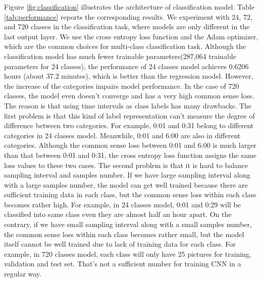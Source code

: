 \documentclass{article}
\begin{document}
Figure \ref{fig:classification} illustrates the architecture of classification model. Table \ref{tab:performance} reports the corresponding results. We experiment with 24, 72, and 720 classes in the classification task, where models are only different in the last output layer. We use the cross entropy loss function and the Adam optimizer, which are the common choices for multi-class classification task. Although the classification model has much fewer trainable parameters(287,064 trainable parameters for 24 classes), the performance of 24 classes model achieves 0.6206 hours (about 37.2 minutes), which is better than the regression model. However, the increase of the categories impairs model performance. In the case of 720 classes, the model even doesn't converge and has a very high common sense loss. The reason is that using time intervals as class labels has many drawbacks. The first problem is that this kind of label representation can't measure the degree of difference between two categories. For example, 0:01 and 0:31 belong to different categories in 24 classes model. Meanwhile, 0:01 and 6:00 are also in different categories. Although the common sense loss between 0:01 and 6:00 is much larger than that between 0:01 and 0:31, the cross entropy loss function assigns the same loss values to these two cases. The second problem is that it is hard to balance sampling interval and samples number. If we have large sampling interval along with a large samples number, the model can get well trained because there are sufficient training data in each class, but the common sense loss within each class becomes rather high. For example, in 24 classes model, 0:01 and 0:29 will be classified into same class even they are almost half an hour apart. On the contrary, if we have small sampling interval along with a small samples number, the common sense loss within each class becomes rather small, but the model itself cannot be well trained due to lack of training data for each class. For example, in 720 classes model, each class will only have 25 pictures for training, validation and test set. That's not a sufficient number for training CNN in a regular way.
\end{document}
